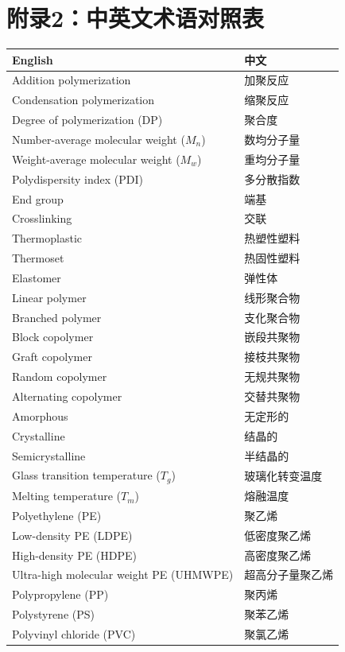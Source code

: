 \documentclass[12pt,a4paper]{ctexart}
\begin{document}
\section*{附录2：中英文术语对照表}
\begin{longtable}{p{10cm}p{5cm}}
\toprule
\textbf{English} & \textbf{中文} \\
\midrule
Addition polymerization & 加聚反应 \\
Condensation polymerization & 缩聚反应 \\
Degree of polymerization (DP) & 聚合度 \\
Number-average molecular weight ($M_n$) & 数均分子量 \\
Weight-average molecular weight ($M_w$) & 重均分子量 \\
Polydispersity index (PDI) & 多分散指数 \\
End group & 端基 \\
Crosslinking & 交联 \\
Thermoplastic & 热塑性塑料 \\
Thermoset & 热固性塑料 \\
Elastomer & 弹性体 \\
Linear polymer & 线形聚合物 \\
Branched polymer & 支化聚合物 \\
Block copolymer & 嵌段共聚物 \\
Graft copolymer & 接枝共聚物 \\
Random copolymer & 无规共聚物 \\
Alternating copolymer & 交替共聚物 \\
Amorphous & 无定形的 \\
Crystalline & 结晶的 \\
Semicrystalline & 半结晶的 \\
Glass transition temperature ($T_g$) & 玻璃化转变温度 \\
Melting temperature ($T_m$) & 熔融温度 \\
Polyethylene (PE) & 聚乙烯 \\
Low-density PE (LDPE) & 低密度聚乙烯 \\
High-density PE (HDPE) & 高密度聚乙烯 \\
Ultra-high molecular weight PE (UHMWPE) & 超高分子量聚乙烯 \\
Polypropylene (PP) & 聚丙烯 \\
Polystyrene (PS) & 聚苯乙烯 \\
Polyvinyl chloride (PVC) & 聚氯乙烯 \\

\end{longtable}
\end{document}
